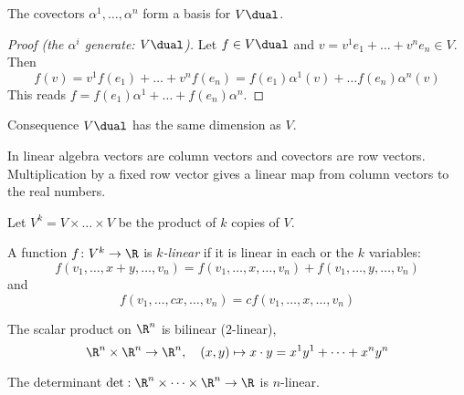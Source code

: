 \begin{frame}
    \begin{prop}
      The covectors $\alpha^1, \dots, \alpha^n$ form a basis for $V\dual$.
    \end{prop}
    \begin{proof}[Proof (the $\alpha^i$ generate: $V\dual$)]
      Let $f \in V\dual$ and $v = v^1e_1 + \dots + v^n e_n \in V$.
      Then 
      \begin{displaymath}
        f(v) = v^1f(e_1) + \dots + v^nf(e_n) =
        f(e_1) \alpha^1(v) + \dots
        f(e_n) \alpha^n(v)
      \end{displaymath}
      This reads $f = f(e_1) \alpha^1 + \dots + f(e_n) \alpha^n.$
    \end{proof}
    \begin{block}
      {Consequence}
      $V\dual$ has the same dimension as $V$.
    \end{block}
    \begin{remark}
      In linear algebra vectors are column vectors and covectors are row
      vectors. Multiplication by a fixed row vector gives a linear map
      from column vectors to the real numbers.
    \end{remark}
\end{frame}
\begin{frame}
  Let $V^k = V \times \dots \times V$ be the product of $k$ copies of $V$.
  \begin{defn}
    A function $f \colon V^k \to \R$ is {\em $k$-linear} if it is
    linear in each or the $k$ variables:
    \begin{displaymath}
      f(v_1, \dots,  x + y, \dots, v_n) =
      f(v_1, \dots,  x, \dots, v_n) +
      f(v_1, \dots,  y, \dots, v_n)
    \end{displaymath}
    and
    \begin{displaymath}
      f(v_1, \dots,  cx, \dots, v_n) =
      cf(v_1, \dots,  x, \dots, v_n) 
    \end{displaymath}
  \end{defn}
  \begin{example}
    The scalar product on $\R^n$ is bilinear ($2$-linear),
    \begin{displaymath}
      \R^n \times \R^n \to \R^n, \quad (x, y) \mapsto x \cdot y = x^1 y^1 + \dots
      + x^n y^n
    \end{displaymath}
  \end{example}
  \begin{example}
    The determinant $\det: \R^n \times \dots \times \R^n \to \R$ is $n$-linear.
  \end{example}
\end{frame}
